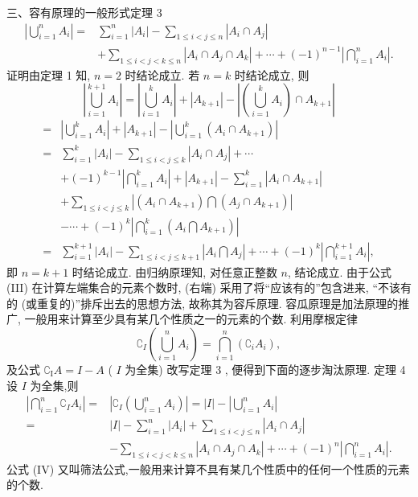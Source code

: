 三、容有原理的一般形式定理 3
$$
\begin{aligned}
\left|\bigcup_{i=1}^n A_i\right|= & \sum_{i=1}^n\left|A_i\right|-\sum_{1 \leqslant i<j \leqslant n}\left|A_i \cap A_j\right| \\
& +\sum_{1 \leqslant i<j<k \leqslant n}\left|A_i \cap A_j \cap A_k\right|+\cdots+(-1)^{n-1}\left|\bigcap_{i=1}^n A_i\right| .
\end{aligned}
$$
证明由定理 1 知, $n=2$ 时结论成立.
若 $n=k$ 时结论成立, 则
$$
\left|\bigcup_{i=1}^{k+1} A_i\right|=\left|\bigcup_{i=1}^k A_i\right|+\left|A_{k+1}\right|-\left|\left(\bigcup_{i=1}^k A_i\right) \cap A_{k+1}\right|
$$
$$
\begin{aligned}
= & \left|\bigcup_{i=1}^k A_i\right|+\left|A_{k+1}\right|-\left|\bigcup_{i=1}^k\left(A_i \cap A_{k+1}\right)\right| \\
= & \sum_{i=1}^k\left|A_i\right|-\sum_{1 \leqslant i<j \leqslant k}\left|A_i \cap A_j\right|+\cdots \\
& +(-1)^{k-1}\left|\bigcap_{i=1}^k A_i\right|+\left|A_{k+1}\right|-\sum_{i=1}^k\left|A_i \cap A_{k+1}\right| \\
& +\sum_{1 \leqslant i<j \leqslant k}\left|\left(A_i \cap A_{k+1}\right) \bigcap\left(A_j \cap A_{k+1}\right)\right| \\
& -\cdots+(-1)^k\left|\bigcap_{i=1}^k\left(A_i \bigcap A_{k+1}\right)\right| \\
= & \sum_{i=1}^{k+1}\left|A_i\right|-\sum_{1 \leqslant i<j \leqslant k+1}\left|A_i \bigcap A_j\right|+\cdots+(-1)^k\left|\bigcap_{i=1}^{k+1} A_i\right|,
\end{aligned}
$$
即 $n=k+1$ 时结论成立.
由归纳原理知, 对任意正整数 $n$, 结论成立.
由于公式 (III) 在计算左端集合的元素个数时, (右端) 采用了将“应该有的”包含进来, “不该有的 (或重复的)”排斥出去的思想方法, 故称其为容斥原理.
容瓜原理是加法原理的推广, 一般用来计算至少具有某几个性质之一的元素的个数.
利用摩根定律
$$
\complement_I\left(\bigcup_{i=1}^n A_i\right)=\bigcap_{i=1}^n\left(\complement_i A_i\right),
$$
及公式 $\complement_{\mathrm{I}} A=I-A$ ( $I$ 为全集) 改写定理 3 , 便得到下面的逐步淘汰原理.
定理 4 设 $I$ 为全集,则
$$
\begin{aligned}
\left|\bigcap_{i=1}^n \complement_I A_i\right|= & \left|\complement_I\left(\bigcup_{i=1}^n A_i\right)\right|=|I|-\left|\bigcup_{i=1}^n A_i\right| \\
= & |I|-\sum_{i=1}^n\left|A_i\right|+\sum_{1 \leqslant i<j \leqslant n}\left|A_i \cap A_j\right| \\
& -\sum_{1 \leqslant i<j<k \leqslant n}\left|A_i \cap A_j \cap A_k\right|+\cdots+(-1)^n\left|\bigcap_{i=1}^n A_i\right| .
\end{aligned}
$$
公式 (IV) 又叫筛法公式,一般用来计算不具有某几个性质中的任何一个性质的元素的个数.




